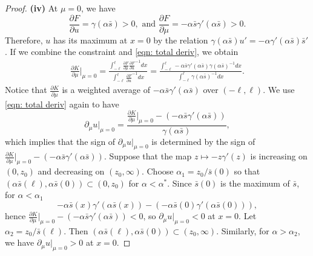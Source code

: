 \documentclass{article}
\begin{document}
\begin{proof}
\textbf{(iv)}  At $\mu=0$, we have 
\begin{equation*}
    \frac{\partial F}{\partial u}  = \gamma(\alpha \bar s)>0, \text{ and } \frac{\partial F}{\partial \mu}  = -\alpha\bar s\gamma'(\alpha\bar s)>0.
\end{equation*} Therefore, $u$ has its maximum at $x=0$ by the relation $\gamma(\alpha\bar s)u' = -\alpha\gamma'(\alpha \bar s)\bar s'$.  
If we combine the constraint and \eqref{eqn: total deriv}, we obtain 
\begin{align*}
    \frac{\partial K}{\partial \mu} \Big|_{{\mu=0}} = \frac{\int_{-\ell}^{\ell}\frac{\partial F}{\partial \mu}  \frac{\partial F}{\partial u} ^{-1}dx}{\int_{-\ell}^{\ell}\frac{\partial F}{\partial u} ^{-1}dx} =\frac{\int_{-\ell}^{\ell}-\alpha\bar s\gamma'(\alpha\bar s) \gamma(\alpha \bar s)^{-1}dx}{\int_{-\ell}^{\ell}\gamma(\alpha \bar s)^{-1}dx}.
\end{align*} Notice that $\frac{\partial K}{\partial \mu} $ is a weighted average of $-\alpha\bar s \gamma'(\alpha \bar s)$ over $(-\ell,\ell)$. We use \eqref{eqn: total deriv} again to have
\begin{equation*}
    \partial_\mu u\Big|_{\mu=0} = \frac{\frac{\partial K}{\partial \mu} \big|_{\mu=0} -(-\alpha\bar s\gamma'(\alpha\bar s))}{\gamma(\alpha\bar s)},
\end{equation*} which implies that the sign of $\partial_\mu u\big|_{\mu=0}$ is determined by the sign of $\frac{\partial K}{\partial \mu} \big|_{\mu=0} -(-\alpha\bar s\gamma'(\alpha\bar s))$. Suppose that the map $z\mapsto -z\gamma'(z)$ is increasing on $(0,z_0)$ and decreasing on $(z_0,\infty)$. Choose $\alpha_1 = z_0/\bar s(0)$ so that  $(\alpha\bar s(\ell),\alpha\bar  s(0))\subset (0,z_0)$ for $\alpha<\alpha^*$. Since $\bar s(0)$ is the maximum of $\bar s$, for $\alpha<\alpha_1$
\begin{equation*}
    -\alpha\bar s(x)\gamma'(\alpha\bar s(x)) - (-\alpha\bar s(0)\gamma'(\alpha\bar s(0))),
\end{equation*} hence $\frac{\partial K}{\partial \mu} \big|_{\mu=0} -(-\alpha\bar s\gamma'(\alpha\bar s))<0$, so $\partial_\mu u\big|_{\mu=0}<0$ at $x=0$. Let $\alpha_2 = z_0/\bar s(\ell)$. Then $(\alpha \bar s (\ell),\alpha \bar s (0))\subset (z_0,\infty)$. Similarly, for $\alpha>\alpha_2$, we have $\partial_\mu u\big|_{\mu=0}>0$ at $x=0$.

\end{proof}
\end{document}
